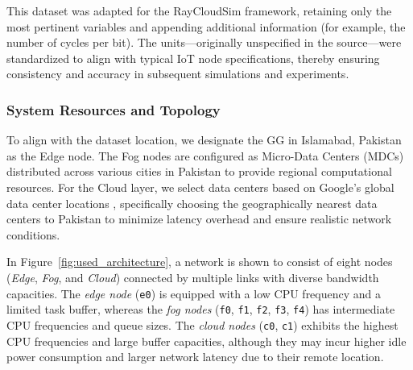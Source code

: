 \documentclass[preprint,3p,authoryear]{elsarticle}
\begin{document}
\begin{table}[h!]
\centering

\caption{Statistical Summary of Generated Tasks}\label{tab:task-statistics}
\end{table}

This dataset was adapted for the RayCloudSim framework, retaining only the most pertinent variables and appending additional information (for example, the number of cycles per bit). The units—originally unspecified in the source—were standardized to align with typical IoT node specifications, thereby ensuring consistency and accuracy in subsequent simulations and experiments.

\subsubsection{System Resources and Topology}\label{subsec:system_resources_topology}

To align with the dataset location, we designate the GG in Islamabad, Pakistan as the Edge node. The Fog nodes are configured as Micro-Data Centers (MDCs) distributed across various cities in Pakistan to provide regional computational resources. For the Cloud layer, we select data centers based on Google's global data center locations \citep{googleDataCenters}, specifically choosing the geographically nearest data centers to Pakistan to minimize latency overhead and ensure realistic network conditions.


In Figure~\ref{fig:used_architecture}, a network is shown to consist of eight nodes (\textit{Edge}, \textit{Fog}, and \textit{Cloud}) connected by multiple links with diverse bandwidth capacities. The \textit{edge node} (\texttt{e0}) is equipped with a low CPU frequency and a limited task buffer, whereas the \textit{fog nodes} (\texttt{f0}, \texttt{f1}, \texttt{f2}, \texttt{f3}, \texttt{f4}) has intermediate CPU frequencies and queue sizes. The \textit{cloud nodes} (\texttt{c0}, \texttt{c1}) exhibits the highest CPU frequencies and large buffer capacities, although they may incur higher idle power consumption and larger network latency due to their remote location.
\end{document}
